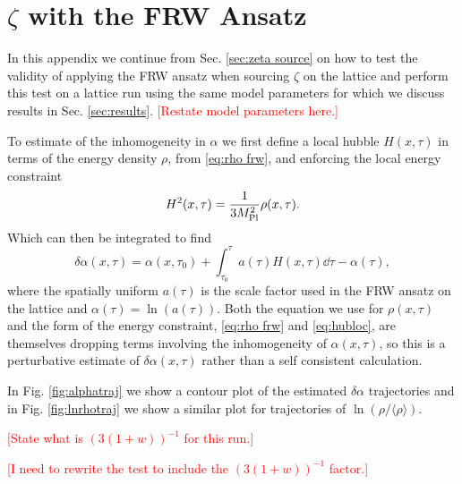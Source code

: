 

\section{$\zeta$ with the FRW Ansatz} \label{appendix:frw_zeta}
In this appendix we continue from Sec. \ref{sec:zeta source} on how to test the validity of applying the FRW ansatz when sourcing $\zeta$ on the lattice and perform this test on a lattice run using the same model parameters for which we discuss results in Sec. \ref{sec:results}. \textcolor{red}{[Restate model parameters here.]}    

To estimate of the inhomogeneity in $\alpha$ we first define a local hubble $H(x,\tau)$ in terms of the energy density $\rho$, from \eqref{eq:rho frw}, and enforcing the local energy constraint
\begin{equation}
  H^2(x,\tau) = \frac{1}{3M_{\mathrm{Pl}}^2}\rho(x,\tau). \label{eq:hubloc}
\end{equation}
Which can then be integrated to find
\begin{equation}
  \delta\alpha(x,\tau) = \alpha(x,\tau_0) + \int_{\tau_0}^\tau a(\tau)H(x,\tau)\dd\tau - \alpha(\tau), \label{eq:alphaloc}
\end{equation}
where the spatially uniform $a(\tau)$ is the scale factor used in the FRW ansatz on the lattice and $\alpha(\tau) = \ln(a(\tau))$.
Both the equation we use for $\rho(x,\tau)$ and the form of the energy constraint, \eqref{eq:rho frw} and \eqref{eq:hubloc}, are themselves dropping terms involving the inhomogeneity of $\alpha(x,\tau)$, so this is a perturbative estimate of $\delta\alpha(x,\tau)$ rather than a self consistent calculation.

In Fig. \ref{fig:alphatraj} we show a contour plot of the estimated $\delta\alpha$ trajectories and in Fig. \ref{fig:lnrhotraj} we show a similar plot for trajectories of $\ln(\rho/\langle\rho\rangle)$. 

\textcolor{red}{[State what is $(3(1+w))^{-1}$ for this run.]}

\textcolor{red}{[I need to rewrite the test to include the $(3(1+w))^{-1}$ factor.]}

\Falphatraj
\Flnrhotraj
